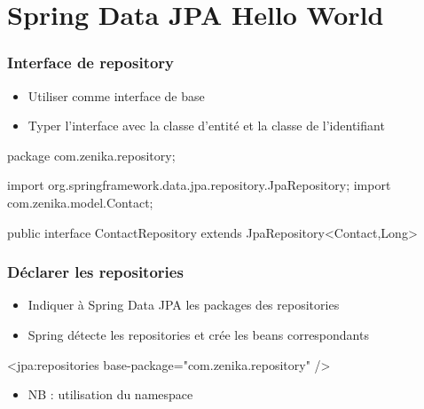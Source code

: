 \section{Spring Data JPA Hello World}



\begin{frame}[fragile]
 \frametitle{Interface de repository}
 \begin{itemize}
  \item Utiliser  comme interface de base
  \item Typer l'interface avec la classe d'entité et la classe de l'identifiant
 \end{itemize}
 
 \begin{javacode}
package com.zenika.repository;

import org.springframework.data.jpa.repository.JpaRepository;
import com.zenika.model.Contact;

public interface ContactRepository 
       extends JpaRepository<Contact,Long> {

}
 \end{javacode}

\end{frame}

\begin{frame}[fragile]
 \frametitle{Déclarer les repositories}
 \begin{itemize}
  \item Indiquer à Spring Data JPA les packages des repositories
  \item Spring détecte les repositories et crée les beans correspondants
 \end{itemize}

\begin{xmlcode}
<jpa:repositories base-package="com.zenika.repository" />
\end{xmlcode}

 \begin{itemize}
  \item NB : utilisation du namespace 
 \end{itemize}

\end{frame}

